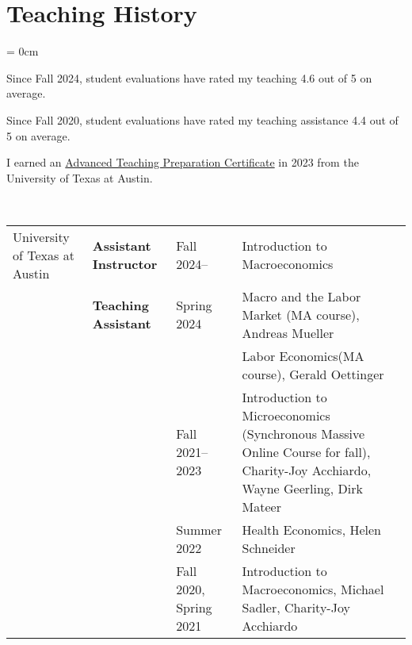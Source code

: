 \documentclass[a4paper, 10pt]{article}
\begin{document}
  \section{Teaching History}\label{sec:teaching_history}
  \begin{compactitem}\parskip = 0cm
    \item Since Fall 2024, student evaluations have rated my teaching 4.6 out of 5 on average.
    \item Since Fall 2020, student evaluations have rated my teaching assistance 4.4 out of 5 on average.
    \item I earned an \href{https://ctl.utexas.edu/teaching-preparation-series}{Advanced Teaching Preparation Certificate} in 2023 from the University of Texas at Austin.
  \end{compactitem}
  \vspace*{0.70em}
  ~\begin{tabular}{p{2.3cm} p{3.1cm} p{2.3cm} p{6.4cm}}
    University of \newline Texas at Austin & \textbf{Assistant Instructor} & Fall 2024-- & Introduction to Macroeconomics\\
    & \textbf{Teaching Assistant} & Spring 2024 & Macro and the Labor Market \newline (MA course), Andreas Mueller\\
    & & & Labor Economics\newline (MA course), Gerald Oettinger\\
    & & Fall 2021--2023 & Introduction to Microeconomics \newline (Synchronous Massive Online Course for \newline fall), Charity-Joy Acchiardo, Wayne \newline Geerling, Dirk Mateer\\
    & & Summer 2022 & Health Economics, Helen Schneider\\
    & & Fall 2020, \newline Spring 2021 & Introduction to Macroeconomics, \newline Michael Sadler, Charity-Joy Acchiardo
  \end{tabular}
  \vspace*{0.25em}
\end{document}
